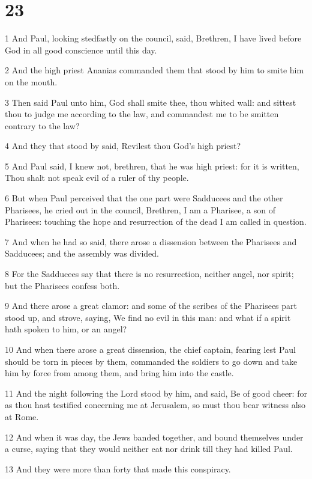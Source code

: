\chapter{23}

\par 1 And Paul, looking stedfastly on the council, said, Brethren, I have lived before God in all good conscience until this day.
\par 2 And the high priest Ananias commanded them that stood by him to smite him on the mouth.
\par 3 Then said Paul unto him, God shall smite thee, thou whited wall: and sittest thou to judge me according to the law, and commandest me to be smitten contrary to the law?
\par 4 And they that stood by said, Revilest thou God's high priest?
\par 5 And Paul said, I knew not, brethren, that he was high priest: for it is written, Thou shalt not speak evil of a ruler of thy people.
\par 6 But when Paul perceived that the one part were Sadducees and the other Pharisees, he cried out in the council, Brethren, I am a Pharisee, a son of Pharisees: touching the hope and resurrection of the dead I am called in question.
\par 7 And when he had so said, there arose a dissension between the Pharisees and Sadducees; and the assembly was divided.
\par 8 For the Sadducees say that there is no resurrection, neither angel, nor spirit; but the Pharisees confess both.
\par 9 And there arose a great clamor: and some of the scribes of the Pharisees part stood up, and strove, saying, We find no evil in this man: and what if a spirit hath spoken to him, or an angel?
\par 10 And when there arose a great dissension, the chief captain, fearing lest Paul should be torn in pieces by them, commanded the soldiers to go down and take him by force from among them, and bring him into the castle.
\par 11 And the night following the Lord stood by him, and said, Be of good cheer: for as thou hast testified concerning me at Jerusalem, so must thou bear witness also at Rome.
\par 12 And when it was day, the Jews banded together, and bound themselves under a curse, saying that they would neither eat nor drink till they had killed Paul.
\par 13 And they were more than forty that made this conspiracy.
